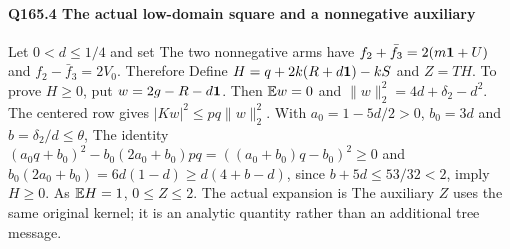 \paragraph{Q165.4 The actual low-domain square and a nonnegative auxiliary}\label{part:Q165.4}
Let $0<\allowbreak d\le\allowbreak 1/4$ and set
The two nonnegative arms have $f_2+\bar f_3=\allowbreak 2(m\mathbf1+U)$ and
$f_2-\bar f_3=\allowbreak 2V_0$. Therefore
Define $H=\allowbreak q+2k(R+d\mathbf1)-kS$ and $Z=\allowbreak TH$.
To prove $H\ge\allowbreak 0$, put $w=\allowbreak 2g-R-d\mathbf1$. Then
$\mathbb E w=\allowbreak 0$ and $\|w\|_2^2=\allowbreak 4d+\delta_2-d^2$.
The centered row gives $|Kw|^2\le\allowbreak  pq\|w\|_2^2$.
With $a_0=\allowbreak 1-5d/2>\allowbreak 0$, $b_0=\allowbreak 3d$ and $b=\allowbreak \delta_2/d\le\allowbreak \theta$,
The identity
$(a_0q+b_0)^2-b_0(2a_0+b_0)pq=\allowbreak ((a_0+b_0)q-b_0)^2\ge\allowbreak 0$
and $b_0(2a_0+b_0)=\allowbreak 6d(1-d)\ge\allowbreak  d(4+b-d)$, since
$b+5d\le\allowbreak 53/32<\allowbreak 2$, imply $H\ge\allowbreak 0$.
As $\mathbb E H=\allowbreak 1$, $0\le\allowbreak  Z\le\allowbreak 2$. The actual expansion is
The auxiliary $Z$ uses the same original kernel; it is an analytic
quantity rather than an additional tree message.

